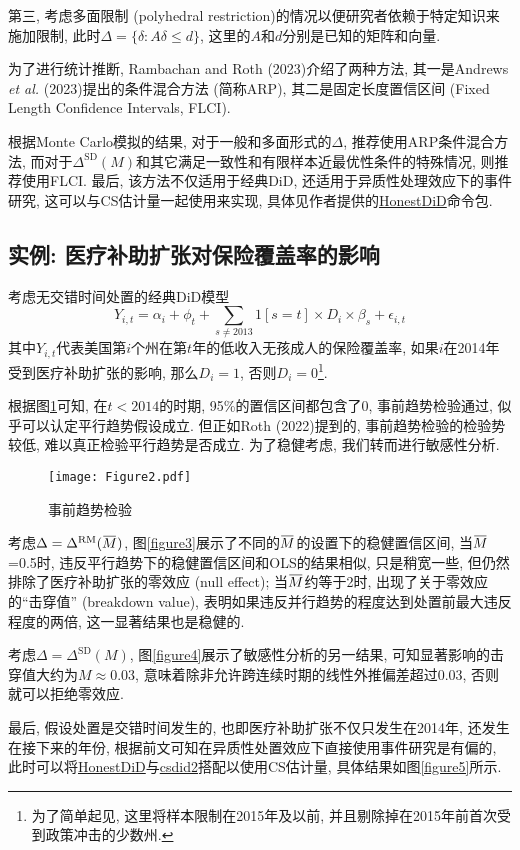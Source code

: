 \documentclass[cn,sakura,14pt,screen,bibstyle=gb7714-2015,math=mtpro2]{elegantnote}
\newcommand{\overbar}[1]{\mkern 1.5mu\overline{\mkern-1.5mu#1\mkern-1.5mu}\mkern 1.5mu}
\begin{document}
第三, 考虑多面限制 (polyhedral restriction)的情况以便研究者依赖于特定知识来施加限制, 此时$\Delta=\{\delta:A\delta\leq d\}$, 这里的$A$和$d$分别是已知的矩阵和向量.

为了进行统计推断, Rambachan and Roth (2023)介绍了两种方法, 其一是Andrews \emph{et al.} (2023)提出的条件混合方法 (简称ARP), 其二是固定长度置信区间 (Fixed Length Confidence Intervals, FLCI).

根据Monte Carlo模拟的结果, 对于一般和多面形式的$\Delta$, 推荐使用ARP条件混合方法, 而对于$\Delta^\text{SD}(M)$和其它满足一致性和有限样本近最优性条件的特殊情况, 则推荐使用FLCI. 最后, 该方法不仅适用于经典DiD, 还适用于异质性处理效应下的事件研究, 这可以与CS估计量一起使用来实现, 具体见作者提供的\href{https://github.com/asheshrambachan/HonestDiD}{HonestDiD}命令包.

\subsection{实例: 医疗补助扩张对保险覆盖率的影响}
考虑无交错时间处置的经典DiD模型
$$Y_{i,t}=\alpha_i+\phi_t+\sum_{s\neq2013}1[s=t]\times D_i\times \beta_s+\epsilon_{i,t}$$
其中$Y_{i,t}$代表美国第$i$个州在第$t$年的低收入无孩成人的保险覆盖率, 如果$i$在2014年受到医疗补助扩张的影响, 那么$D_i=1$, 否则$D_i=0$\footnote{为了简单起见, 这里将样本限制在2015年及以前, 并且剔除掉在2015年前首次受到政策冲击的少数州.}.

根据图\ref{figure2}可知, 在$t<2014$的时期, 95\%的置信区间都包含了0, 事前趋势检验通过, 似乎可以认定平行趋势假设成立. 但正如Roth (2022)提到的, 事前趋势检验的检验势较低, 难以真正检验平行趋势是否成立. 为了稳健考虑, 我们转而进行敏感性分析.
\begin{figure}
  \centering
  \texttt{[image: Figure2.pdf]}
  \caption{事前趋势检验}\label{figure2}
\end{figure}

考虑$\Delta=\Delta^\text{RM}(\overbar{M})$, 图\ref{figure3}展示了不同的$\overbar{M}$的设置下的稳健置信区间, 当$\overbar{M}$=0.5时, 违反平行趋势下的稳健置信区间和OLS的结果相似, 只是稍宽一些, 但仍然排除了医疗补助扩张的零效应 (null effect); 当$\overbar{M}$约等于2时, 出现了关于零效应的“击穿值” (breakdown value), 表明如果违反并行趋势的程度达到处置前最大违反程度的两倍, 这一显著结果也是稳健的.

考虑$\Delta=\Delta^\text{SD}(M)$, 图\ref{figure4}展示了敏感性分析的另一结果, 可知显著影响的击穿值大约为$M\approx 0.03$, 意味着除非允许跨连续时期的线性外推偏差超过0.03, 否则就可以拒绝零效应.

最后, 假设处置是交错时间发生的, 也即医疗补助扩张不仅只发生在2014年, 还发生在接下来的年份, 根据前文可知在异质性处置效应下直接使用事件研究是有偏的, 此时可以将\href{https://github.com/mcaceresb/stata-honestdid}{HonestDiD}与\href{https://github.com/friosavila/csdid2}{csdid2}搭配以使用CS估计量, 具体结果如图\ref{figure5}所示.
\end{document}

